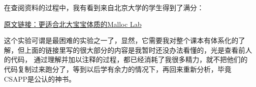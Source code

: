 在查阅资料的过程中，我有看到来自北京大学的学生得到了满分：

\href{https://arthals.ink/posts/experience/malloc-lab7}{原文链接：更适合北大宝宝体质的Malloc Lab}

这个实验可谓是最困难的实验之一了，显然，它需要我对整个课本有体系化的了解，但上面的链接里写的很大部分的内容是我暂时还没办法看懂的，光是查看前人的代码，
通过理解并加以注释的过程，都已经消耗了我很多精力，就不把他们的代码复制过来跑分了，等到以后学有余力的情况下，再回来重新分析，毕竟CSAPP是公认的神书。

